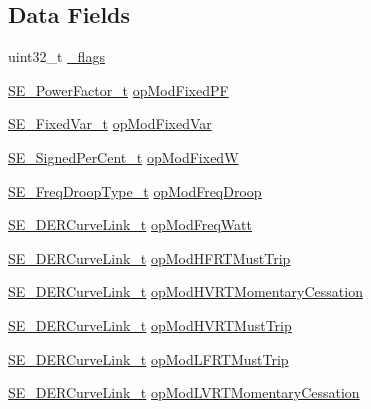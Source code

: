 \subsection*{Data Fields}
\begin{DoxyCompactItemize}
\item 
uint32\+\_\+t \hyperlink{group__DERControlBase_gaf48e1f28d437a79aba1ac66fb63ca37f}{\+\_\+flags}
\item 
\hyperlink{structSE__PowerFactor__t}{S\+E\+\_\+\+Power\+Factor\+\_\+t} \hyperlink{group__DERControlBase_ga1bf6e505bc8ec7cd081352a3c451f04a}{op\+Mod\+Fixed\+PF}
\item 
\hyperlink{structSE__FixedVar__t}{S\+E\+\_\+\+Fixed\+Var\+\_\+t} \hyperlink{group__DERControlBase_ga4adf111637bfacae44bdc13b01705a22}{op\+Mod\+Fixed\+Var}
\item 
\hyperlink{group__SignedPerCent_ga3a844f23440f7c1756032f6ef2359fdf}{S\+E\+\_\+\+Signed\+Per\+Cent\+\_\+t} \hyperlink{group__DERControlBase_ga14d4dc75a71ba474a05b997aae88e069}{op\+Mod\+FixedW}
\item 
\hyperlink{structSE__FreqDroopType__t}{S\+E\+\_\+\+Freq\+Droop\+Type\+\_\+t} \hyperlink{group__DERControlBase_gae6d51c07133aedc89b90801e45e86cc1}{op\+Mod\+Freq\+Droop}
\item 
\hyperlink{structSE__DERCurveLink__t}{S\+E\+\_\+\+D\+E\+R\+Curve\+Link\+\_\+t} \hyperlink{group__DERControlBase_ga78557963030045b7549535be8003bb1b}{op\+Mod\+Freq\+Watt}
\item 
\hyperlink{structSE__DERCurveLink__t}{S\+E\+\_\+\+D\+E\+R\+Curve\+Link\+\_\+t} \hyperlink{group__DERControlBase_gaef9f47c883d5d5396d782f0302bf77b7}{op\+Mod\+H\+F\+R\+T\+Must\+Trip}
\item 
\hyperlink{structSE__DERCurveLink__t}{S\+E\+\_\+\+D\+E\+R\+Curve\+Link\+\_\+t} \hyperlink{group__DERControlBase_gafe0a7951692bbd4f45dfb6c59a621b0c}{op\+Mod\+H\+V\+R\+T\+Momentary\+Cessation}
\item 
\hyperlink{structSE__DERCurveLink__t}{S\+E\+\_\+\+D\+E\+R\+Curve\+Link\+\_\+t} \hyperlink{group__DERControlBase_ga6117ce2942b55045220c21fc407bae79}{op\+Mod\+H\+V\+R\+T\+Must\+Trip}
\item 
\hyperlink{structSE__DERCurveLink__t}{S\+E\+\_\+\+D\+E\+R\+Curve\+Link\+\_\+t} \hyperlink{group__DERControlBase_ga358ba75007797cfce59e113e52eac3d8}{op\+Mod\+L\+F\+R\+T\+Must\+Trip}
\item 
\hyperlink{structSE__DERCurveLink__t}{S\+E\+\_\+\+D\+E\+R\+Curve\+Link\+\_\+t} \hyperlink{group__DERControlBase_ga2741d46500aa811e2ed79fe29493729a}{op\+Mod\+L\+V\+R\+T\+Momentary\+Cessation}

\end{DoxyCompactItemize}
